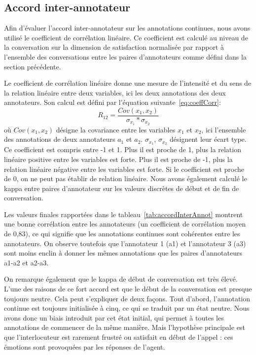 \subsection{Accord inter-annotateur}
Afin d’évaluer l’accord inter-annotateur sur les annotations continues, nous avons utilisé le coefficient de corrélation linéaire. Ce coefficient est calculé au niveau de la conversation sur la dimension de satisfaction normalisée par rapport à l’ensemble des conversations entre les paires d’annotateurs comme défini dans la section précédente.

Le coefficient de corrélation linéaire donne une mesure de l'intensité et du sens de la relation linéaire entre deux variables, ici les deux annotations des deux annotateurs. Son calcul est défini par l'équation suivante~\ref{eq:coeffCorr}:
\begin{equation}
  R_{12} = \dfrac{Cov(x_1,x_2)}{\sigma_{x_1}*\sigma_{x_2}}
  \label{eq:coeffCorr}
\end{equation}
où $Cov(x_1,x_2)$ désigne la covariance entre les variables $x_1$ et $x_2$, ici l'ensemble des annotations de deux annotateurs $a_1$ et $a_2$. $\sigma_{x_1}$, $\sigma_{x_2}$ désignent leur écart type.
Ce coefficient est compris entre -1 et 1. Plus il est proche de 1, plus la relation linéaire positive entre les variables est forte. Plus il est proche de -1, plus la relation linéaire négative entre les variables est forte. Si le coefficient est proche de 0, on ne peut pas établir de relation linéaire.
Nous avons également calculé le kappa entre paires d'annotateur sur les valeurs discrètes de début et de fin de conversation.



Les valeurs finales rapportées dans le tableau~\ref{tab:accordInterAnnot} montrent une bonne corrélation entre les annotateurs (un coefficient de corrélation moyen de 0,83), ce qui signifie que les annotations continues sont cohérentes entre les annotateurs.
On observe toutefois que l'annotateur 1 (a1) et l'annotateur 3 (a3) sont moins enclin à donner les mêmes annotations que les paires d'annotateurs a1-a2 et a2-a3.

On remarque également que le kappa de début de conversation est très élevé. L’une des raisons de ce fort accord est que le début de la conversation est presque toujours neutre. Cela peut s’expliquer de deux façons. Tout d’abord, l’annotation continue est toujours initialisée à cinq, ce qui se traduit par un état neutre. Nous avons donc un biais introduit par cet état initial, qui permet à toutes les annotations de commencer de la même manière.
Mais l’hypothèse principale est que l’interlocuteur est rarement frustré ou satisfait en début de l’appel : ces émotions sont provoquées par les réponses de l’agent.

